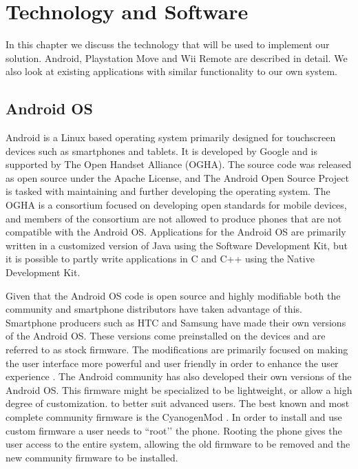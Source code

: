 \chapter{Technology and Software}
In this chapter we discuss the technology that will be used to implement our solution. Android, Playstation Move and Wii Remote are described in detail. We also look at existing applications with similar functionality to our own system. 

\section{Android OS}
Android is a Linux based operating system primarily designed for touchscreen devices such as smartphones and tablets. It is developed by Google and is supported by The Open Handset Alliance (OGHA). The source code was released as open source under the Apache License, and The Android Open Source Project is tasked with maintaining and further developing the operating system. The OGHA is a consortium focused on developing open standards for mobile devices, and members of the consortium are not allowed to produce phones that are not compatible with the Android OS. Applications for the Android OS are primarily written in a customized version of Java using the Software Development Kit, but it is possible to partly write applications in C and C++ using the Native Development Kit. 

Given that the Android OS code is open source and highly modifiable both the community and smartphone distributors have taken advantage of this. Smartphone producers such as HTC and Samsung have made their own versions of the Android OS. These versions come preinstalled on the devices and are referred to as stock firmware. The modifications are primarily focused on making the user interface more powerful and user friendly in order to enhance the user experience \cite{htcSense}. The Android community has also developed their own versions of the Android OS. This firmware might be specialized to be lightweight, or allow a high degree of customization. to better suit advanced users. The best known and most complete community firmware is the CyanogenMod \cite{cyanogenMod}. In order to install and use custom firmware a user needs to ``root’’ the phone. Rooting the phone gives the user access to the entire system, allowing the old firmware to be removed and the new community firmware to be installed.

